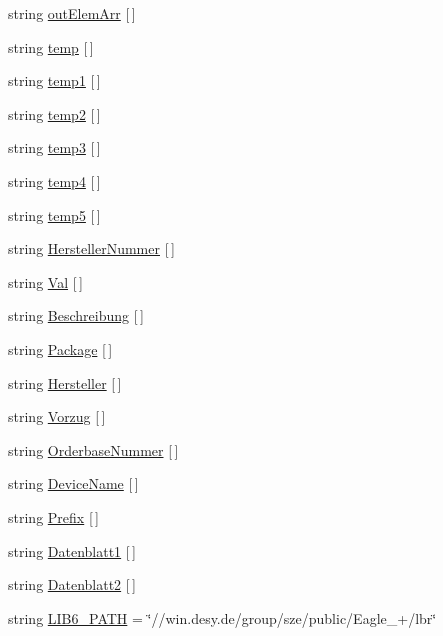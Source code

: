 \begin{DoxyCompactItemize}
\item 
string \hyperlink{readlibs_8ulp_abd552ace971c34ee4d05fc524378dc32}{out\+Elem\+Arr} \mbox{[}$\,$\mbox{]}
\item 
string \hyperlink{readlibs_8ulp_a2f8d954bdd72eba003a9802a6248de83}{temp} \mbox{[}$\,$\mbox{]}
\item 
string \hyperlink{readlibs_8ulp_a1739e013da948312edaaa3ade1bd7f7a}{temp1} \mbox{[}$\,$\mbox{]}
\item 
string \hyperlink{readlibs_8ulp_a93cd3f3f743b20e134149e06efa22a88}{temp2} \mbox{[}$\,$\mbox{]}
\item 
string \hyperlink{readlibs_8ulp_a6d07a7b1d2f2bb3e3061eba3b676dd44}{temp3} \mbox{[}$\,$\mbox{]}
\item 
string \hyperlink{readlibs_8ulp_ad6a0fc9c82629f46ca764b920e57db24}{temp4} \mbox{[}$\,$\mbox{]}
\item 
string \hyperlink{readlibs_8ulp_ad5f54da751f4d315227472fb369d04b5}{temp5} \mbox{[}$\,$\mbox{]}
\item 
string \hyperlink{readlibs_8ulp_a6ba91b18d0979e207105d660a2010d8d}{Hersteller\+Nummer} \mbox{[}$\,$\mbox{]}
\item 
string \hyperlink{readlibs_8ulp_a088204f20433deace071409889b5aba1}{Val} \mbox{[}$\,$\mbox{]}
\item 
string \hyperlink{readlibs_8ulp_a0165df64e95135bade509c58bdb353f1}{Beschreibung} \mbox{[}$\,$\mbox{]}
\item 
string \hyperlink{readlibs_8ulp_a36b57fe679881487796855a589fbfb85}{Package} \mbox{[}$\,$\mbox{]}
\item 
string \hyperlink{readlibs_8ulp_a03dd05fe151d0e9f9edf96078bc234d4}{Hersteller} \mbox{[}$\,$\mbox{]}
\item 
string \hyperlink{readlibs_8ulp_a773ea3bd03d30f9371dda8ee12a97b3a}{Vorzug} \mbox{[}$\,$\mbox{]}
\item 
string \hyperlink{readlibs_8ulp_a57ba39a1335c8ae9ef4eb8314d51160e}{Orderbase\+Nummer} \mbox{[}$\,$\mbox{]}
\item 
string \hyperlink{readlibs_8ulp_add6cc63e92e68ae325b1ecb08776c9b9}{Device\+Name} \mbox{[}$\,$\mbox{]}
\item 
string \hyperlink{readlibs_8ulp_aadcab157eddcbfbc94bcde5363c32934}{Prefix} \mbox{[}$\,$\mbox{]}
\item 
string \hyperlink{readlibs_8ulp_afabb0100cbb25a94f420c30a4f376b58}{Datenblatt1} \mbox{[}$\,$\mbox{]}
\item 
string \hyperlink{readlibs_8ulp_a658ffd52f046be63e7d0116d947c0e6f}{Datenblatt2} \mbox{[}$\,$\mbox{]}
\item 
string \hyperlink{readlibs_8ulp_a44dc1eefd5382033cf032f578a0130b9}{L\+I\+B6\+\_\+\+P\+A\+T\+H} = \char`\"{}//win.\+desy.\+de/group/sze/public/Eagle\+\_+/lbr\char`\"{}
\end{DoxyCompactItemize}


